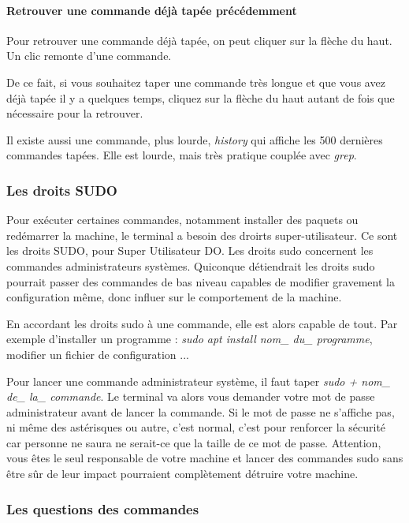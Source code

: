 \paragraph{Retrouver une commande déjà tapée précédemment}
Pour retrouver une commande déjà tapée, on peut cliquer sur la flèche du haut.
Un clic remonte d'une commande.

De ce fait, si vous souhaitez taper une commande très longue et que vous avez
déjà tapée il y a quelques temps, cliquez sur la flèche du haut autant de fois
que nécessaire pour la retrouver.

Il existe aussi une commande, plus lourde, \textit{history} qui affiche les 500
dernières commandes tapées. Elle est lourde, mais très pratique couplée avec
 \textit{grep}.

\subsubsection{Les droits SUDO}

Pour exécuter certaines commandes, notamment installer des paquets ou redémarrer
la machine, le terminal a besoin des droirts super-utilisateur. Ce sont les
droits SUDO, pour Super Utilisateur DO.
Les droits sudo concernent les commandes administrateurs systèmes. Quiconque
détiendrait les droits sudo pourrait passer des commandes de bas niveau capables
de modifier gravement la configuration même, donc influer sur le comportement de
la machine.

En accordant les droits sudo à une commande, elle est alors capable de tout.
Par exemple d'installer un programme : \textit{sudo apt install nom\_ du\_
programme}, modifier un fichier de configuration ...

Pour lancer une commande administrateur système, il faut taper \textit{sudo +
nom\_ de\_ la\_ commande}.
Le terminal va alors vous demander votre mot de passe administrateur avant de
lancer la commande.
Si le mot de passe ne s'affiche pas, ni même des astérisques ou autre, c'est
normal, c'est pour renforcer la sécurité car personne ne saura ne serait-ce que
la taille de ce mot de passe. Attention, vous êtes le seul responsable de
votre machine et lancer des commandes sudo sans être sûr de leur impact
pourraient complètement détruire votre machine.

\subsubsection{Les questions des commandes}

